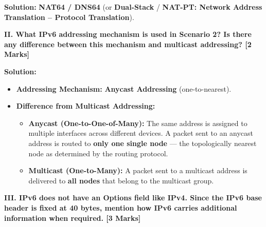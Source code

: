 \documentclass[11pt,a4paper]{article}
\begin{document}
\textbf{Solution:}
\textbf{NAT64 / DNS64} (or \textbf{Dual-Stack} / \textbf{NAT-PT: Network Address Translation -- Protocol Translation}).

\vspace{0.2cm}
\textbf{II. What IPv6 addressing mechanism is used in Scenario 2? Is there any difference between this mechanism and multicast addressing? [2 Marks]}

\textbf{Solution:}
\begin{itemize}
    \item \textbf{Addressing Mechanism:} \textbf{Anycast Addressing} (one-to-nearest).
    \item \textbf{Difference from Multicast Addressing:}
    \begin{itemize}
        \item \textbf{Anycast (One-to-One-of-Many):} The same address is assigned to multiple interfaces across different devices. A packet sent to an anycast address is routed to \textbf{only one single node} --- the topologically nearest node as determined by the routing protocol.
        \item \textbf{Multicast (One-to-Many):} A packet sent to a multicast address is delivered to \textbf{all nodes} that belong to the multicast group.
    \end{itemize}
\end{itemize}

\vspace{0.2cm}
\textbf{III. IPv6 does not have an Options field like IPv4. Since the IPv6 base header is fixed at 40 bytes, mention how IPv6 carries additional information when required. [3 Marks]}
\end{document}
